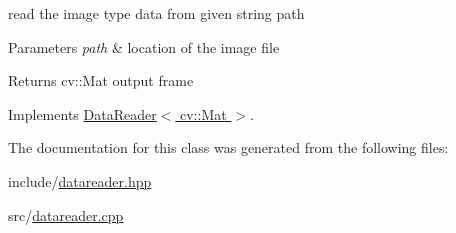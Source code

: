 read the image type data from given string path 


\begin{DoxyParams}{Parameters}
{\em path} & location of the image file \\
\hline
\end{DoxyParams}
\begin{DoxyReturn}{Returns}
cv\+::\+Mat output frame 
\end{DoxyReturn}


Implements \hyperlink{classDataReader}{Data\+Reader$<$ cv\+::\+Mat $>$}.



The documentation for this class was generated from the following files\+:\begin{DoxyCompactItemize}
\item 
include/\hyperlink{datareader_8hpp}{datareader.\+hpp}\item 
src/\hyperlink{datareader_8cpp}{datareader.\+cpp}\end{DoxyCompactItemize}
